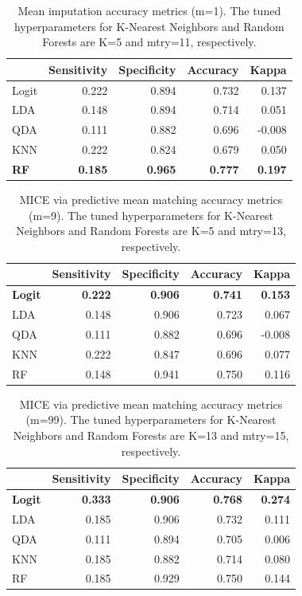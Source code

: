 \documentclass[12pt,]{article}
\begin{document}
\begin{table}[!h]

\caption{\label{tab:unnamed-chunk-9}\label{tab:mean-metrics} Mean imputation accuracy metrics (m=1).  The tuned hyperparameters for K-Nearest Neighbors and Random Forests are K=5 and mtry=11, respectively.}
\centering
\fontsize{10}{12}\selectfont
\begin{tabular}{lrrrr}
\toprule
  & Sensitivity & Specificity & Accuracy & Kappa\\
\midrule
Logit & 0.222 & 0.894 & 0.732 & 0.137\\
LDA & 0.148 & 0.894 & 0.714 & 0.051\\
QDA & 0.111 & 0.882 & 0.696 & -0.008\\
KNN & 0.222 & 0.824 & 0.679 & 0.050\\
\textbf{RF} & \textbf{0.185} & \textbf{0.965} & \textbf{0.777} & \textbf{0.197}\\
\bottomrule
\end{tabular}
\end{table}

\begin{table}[!h]

\caption{\label{tab:unnamed-chunk-10}\label{tab:pmm-metrics} MICE via predictive mean matching accuracy metrics (m=9).  The tuned hyperparameters for K-Nearest Neighbors and Random Forests are K=5 and mtry=13, respectively.}
\centering
\fontsize{10}{12}\selectfont
\begin{tabular}{lrrrr}
\toprule
  & Sensitivity & Specificity & Accuracy & Kappa\\
\midrule
\textbf{Logit} & \textbf{0.222} & \textbf{0.906} & \textbf{0.741} & \textbf{0.153}\\
LDA & 0.148 & 0.906 & 0.723 & 0.067\\
QDA & 0.111 & 0.882 & 0.696 & -0.008\\
KNN & 0.222 & 0.847 & 0.696 & 0.077\\
RF & 0.148 & 0.941 & 0.750 & 0.116\\
\bottomrule
\end{tabular}
\end{table}

\begin{table}[!h]

\caption{\label{tab:unnamed-chunk-11}\label{tab:pmm99-metrics} MICE via predictive mean matching accuracy metrics (m=99).  The tuned hyperparameters for K-Nearest Neighbors and Random Forests are K=13 and mtry=15, respectively.}
\centering
\fontsize{10}{12}\selectfont
\begin{tabular}{lrrrr}
\toprule
  & Sensitivity & Specificity & Accuracy & Kappa\\
\midrule
\textbf{Logit} & \textbf{0.333} & \textbf{0.906} & \textbf{0.768} & \textbf{0.274}\\
LDA & 0.185 & 0.906 & 0.732 & 0.111\\
QDA & 0.111 & 0.894 & 0.705 & 0.006\\
KNN & 0.185 & 0.882 & 0.714 & 0.080\\
RF & 0.185 & 0.929 & 0.750 & 0.144\\
\bottomrule
\end{tabular}
\end{table}
\end{document}
